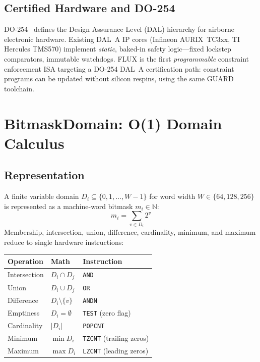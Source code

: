 \documentclass[sigplan,10pt,review]{acmart}
\begin{document}
\subsection{Certified Hardware and DO-254}

DO-254~\cite{do254} defines the Design Assurance Level (DAL) hierarchy for airborne
electronic hardware. Existing DAL~A IP cores (Infineon AURIX~TC3xx, TI Hercules
TMS570) implement \emph{static}, baked-in safety logic---fixed lockstep comparators,
immutable watchdogs. FLUX is the first \emph{programmable} constraint enforcement
ISA targeting a DO-254 DAL~A certification path: constraint programs can be updated
without silicon respins, using the same GUARD toolchain.

\section{BitmaskDomain: O(1) Domain Calculus}
\label{sec:bitmask}

\subsection{Representation}

A finite variable domain $D_i \subseteq \{0, 1, \ldots, W{-}1\}$ for word width $W \in
\{64, 128, 256\}$ is represented as a machine-word bitmask $m_i \in \mathbb{N}$:
\[
  m_i = \sum_{v \in D_i} 2^v
\]
Membership, intersection, union, difference, cardinality, minimum, and maximum
reduce to single hardware instructions:

\begin{center}
\renewcommand{\arraystretch}{1.25}
\begin{tabular}{lll}
\toprule
\textbf{Operation} & \textbf{Math} & \textbf{Instruction} \\
\midrule
Intersection & $D_i \cap D_j$ & \texttt{AND} \\
Union        & $D_i \cup D_j$ & \texttt{OR} \\
Difference   & $D_i \setminus \{v\}$ & \texttt{ANDN} \\
Emptiness    & $D_i = \emptyset$ & \texttt{TEST} (zero flag) \\
Cardinality  & $|D_i|$ & \texttt{POPCNT} \\
Minimum      & $\min D_i$ & \texttt{TZCNT} (trailing zeros) \\
Maximum      & $\max D_i$ & \texttt{LZCNT} (leading zeros) \\
\bottomrule
\end{tabular}
\end{center}
\end{document}

